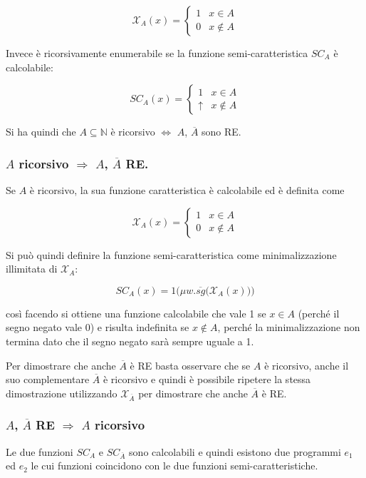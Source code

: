 $$
\mathcal{X}_A(x) = \begin{cases}
1 &x \in A \\
0 &x \notin A
\end{cases} 
$$

Invece è ricorsivamente enumerabile se la funzione semi-caratteristica $SC_A$ è calcolabile:

$$
SC_A(x) = \begin{cases}
1 &x \in A \\
\uparrow &x \notin A
\end{cases} 
$$

Si ha quindi che $A \subseteq \mathbb{N}$ è ricorsivo $\Leftrightarrow$ $A$, $\overline{A}$ sono RE.

\subsubsection{$A$ ricorsivo $\Rightarrow$ $A$, $\overline{A}$ RE. }

Se $A$ è ricorsivo, la sua funzione caratteristica è calcolabile ed è definita come

$$
\mathcal{X}_A(x) = \begin{cases}
1 &x \in A \\
0 &x \notin A
\end{cases} 
$$

Si può quindi definire la funzione semi-caratteristica come minimalizzazione illimitata di $\mathcal{X}_A$:

$$
SC_A(x) = 1 \Bigg( \mu w. \overline{sg} \Big( \mathcal{X}_A(x) \Big) \Bigg)
$$

così facendo si ottiene una funzione calcolabile che vale 1 se $x \in A$ (perché il segno negato vale 0) e risulta indefinita se $x \notin A$, perché la minimalizzazione non termina dato che il segno negato sarà sempre uguale a 1.

Per dimostrare che anche $\overline{A}$ è RE basta osservare che se $A$ è ricorsivo, anche il suo complementare $\overline{A}$ è ricorsivo e quindi è possibile ripetere la stessa dimostrazione utilizzando $\mathcal{X}_{\overline{A}}$ per dimostrare che anche $\overline{A}$ è RE.

\subsubsection{$A$, $\overline{A}$ RE $\Rightarrow$ $A$ ricorsivo}

Le due funzioni $SC_A$ e $SC_{\overline{A}}$ sono calcolabili e quindi esistono due programmi $e_1$ ed $e_2$ le cui funzioni coincidono con le due funzioni semi-caratteristiche.

